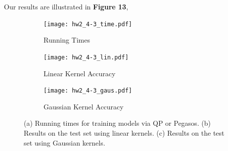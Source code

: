 \documentclass[10pt,psamsfonts]{amsart}
\theoremstyle{definition}
\theoremstyle{remark}
\numberwithin{equation}{section}
\begin{document}
Our results are illustrated in {\bf Figure 13}, 

\begin{figure}
	\centering
	\begin{subfigure}[b]{0.23\textwidth}
		\texttt{[image: hw2\_4-3\_time.pdf]}
		\caption{Running Times}
	\end{subfigure}
	\begin{subfigure}[b]{0.23\textwidth}
		\texttt{[image: hw2\_4-3\_lin.pdf]}
		\caption{Linear Kernel Accuracy}
	\end{subfigure}
	\begin{subfigure}[b]{0.23\textwidth}
		\texttt{[image: hw2\_4-3\_gaus.pdf]}
		\caption{Gaussian Kernel Accuracy}
	\end{subfigure}
	\caption{(a) Running times for training models via QP or Pegasos. (b) Results on the test set using linear kernels. (c) Results on the test set using Gaussian kernels.}
\end{figure}
\end{document}
